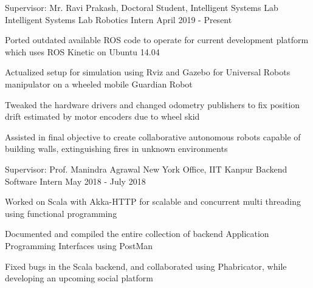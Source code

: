 
\begin{cventries}

 \cventry
    {Supervisor: Mr. Ravi Prakash, Doctoral Student, Intelligent Systems Lab}
    {Intelligent Systems Lab}
    {Robotics Intern}
    {April 2019 - Present}
    {
      \begin{cvitems}
        \item{Ported outdated available ROS code to operate for current development platform which uses ROS Kinetic on Ubuntu 14.04}
        \item{Actualized setup for simulation using Rviz and Gazebo for Universal Robots manipulator on a wheeled mobile Guardian Robot}
        \item{Tweaked the hardware drivers and changed odometry publishers to fix position drift estimated by motor encoders due to wheel skid}
        \item{Assisted in final objective to create collaborative autonomous robots capable of building walls, extinguishing fires in unknown environments}
      \end{cvitems}
    }  

  \cventry
    {Supervisor: Prof. Manindra Agrawal}
    {New York Office, IIT Kanpur}
    {Backend Software Intern}
    {May 2018 - July 2018}
    {
      \begin{cvitems}
        \item{Worked on Scala with Akka-HTTP for scalable and concurrent multi threading using functional programming}
        \item{Documented and compiled the entire collection of backend Application Programming Interfaces using PostMan}
        \item{Fixed bugs in the Scala backend, and collaborated using Phabricator, while developing an upcoming social platform}
      \end{cvitems}
    }
\end{cventries}
